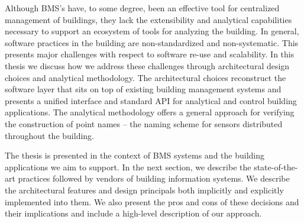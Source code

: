 Although BMS's have, to some degree, been an effective tool for centralized management of buildings, they lack the extensibility
and analytical capabilities necessary to support an ecosystem of tools for analyzing the building.  In general, software
practices in the building are non-standardized and non-systematic.
This presents major challenges with respect to software re-use and scalability.  
In this thesis we discuss how we address these challenges through architectural design choices and analytical methodology.  
The architectural choices reconstruct the software layer that sits on top of existing building management systems and presents
a unified interface and standard API for analytical and control building applications.
The analytical methodology offers a general approach for verifying the construction of point names -- the naming scheme for 
sensors distributed throughout the building.  

The thesis is presented in the context of BMS systems and the building applications we aim to support.
In the next section, we describe the state-of-the-art practices followed by vendors of building information systems.
We describe the architectural features and design principals both implicitly and explicitly implemented into them.
We also present the pros and cons of these decisions and their implications and include a high-level description of our approach.







